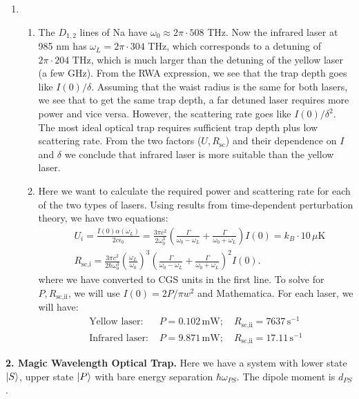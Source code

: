 \documentclass{article}
\theoremstyle{definition}
\newcommand{\al}{\alpha}
\newcommand{\f}[2]{\frac{#1}{#2}}
\newcommand{\lp}{\left(}
\newcommand{\rp}{\right)}
\begin{document}
\begin{enumerate}[label=(\alph*)]
	\item 
	
	\begin{enumerate}[label=(\roman*)]
		\item  The $D_{1,2}$ lines of Na have $\omega_0 \approx 2\pi \cdot 508 $ THz. Now the infrared laser at 985 nm has $\omega_L = 2\pi \cdot 304$ THz, which corresponds to a detuning of $2\pi\cdot 204$ THz, which is much larger than the detuning of the yellow laser (a few GHz). From the RWA expression, we see that the trap depth goes like $I(0)/\delta$. Assuming that the waist radius is the same for both lasers, we see that to get the same trap depth, a far detuned laser requires more power and vice versa. However, the scattering rate goes like $I(0)/\delta^2$. The most ideal optical trap requires sufficient trap depth plus low scattering rate. From the two factors ($U,R_\text{sc}$) and their dependence on $I$ and $\delta$ we conclude that infrared laser is more suitable than the yellow laser. 
		
		\item Here we want to calculate the required power and scattering rate for each of the two types of lasers. Using results from time-dependent perturbation theory, we have two equations:
		\begin{align*}
			&U_i = \f{I(0) \al(\omega_L)}{2c\epsilon_0} =   \f{3\pi c^2}{2\omega_0^3} \lp \f{\Gamma}{\omega_0 - \omega_L} + \f{\Gamma}{\omega_0 + \omega_L}\rp I(0) = k_B \cdot 10 \, \mu\text{K} \\
			& R_\text{sc,i} = \f{3\pi c^2}{2\hbar \omega_0^3}\lp \f{\omega_L}{\omega_0} \rp^3 \lp \f{\Gamma}{\omega_0 - \omega_L} + \f{\Gamma}{\omega_0 + \omega_L} \rp^2 I(0).
		\end{align*}
	where we have converted to CGS units in the first line. To solve for $P,R_{\text{sc,ii}}$, we will use $I(0)=2P/\pi w^2$ and Mathematica. For each laser, we will have:
	\begin{align*}
		\text{Yellow laser: } \,\,& 
		P = 0.102 \,\text{mW}; \quad 
		R_{\text{sc,ii}} = 7637 \,\text{s}^{-1}\\
		\text{Infrared laser:}\,\,&  
		P = 9.871 \, \text{mW}; \quad 
		R_{\text{sc,ii}} = 17.11 \,\text{s}^{-1}
	\end{align*}

	\end{enumerate}
\end{enumerate}


\noindent \textbf{2. Magic Wavelength Optical Trap.} Here we have a system with lower state $\ket{S}$, upper state $\ket{P}$ with bare energy separation $\hbar \omega_{PS}$. The dipole moment is $d_{PS}$. 
\end{document}
